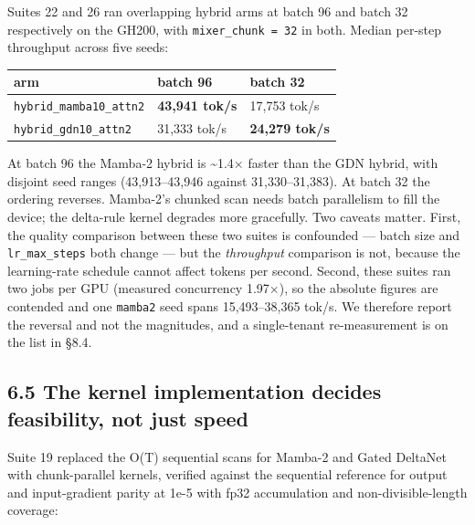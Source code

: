 Suites 22 and 26 ran overlapping hybrid arms at batch 96 and batch 32 respectively on the GH200,
with \texttt{mixer\_chunk\ =\ 32} in both. Median per-step throughput across five seeds:

{%
{\small\begin{longtable}[]{@{}lll@{}}
\toprule\noalign{}
arm & batch 96 & batch 32 \\
\midrule\noalign{}
\endhead
\bottomrule\noalign{}
\endlastfoot
\texttt{hybrid\_mamba10\_attn2} & \textbf{43,941 tok/s} & 17,753 tok/s \\
\texttt{hybrid\_gdn10\_attn2} & 31,333 tok/s & \textbf{24,279 tok/s} \\
\end{longtable}}
}

At batch 96 the Mamba-2 hybrid is \textasciitilde1.4$\times$ faster than the GDN hybrid, with disjoint seed ranges
(43,913--43,946 against 31,330--31,383). At batch 32 the ordering reverses. Mamba-2's chunked scan
needs batch parallelism to fill the device; the delta-rule kernel degrades more gracefully. Two
caveats matter. First, the quality comparison between these two suites is confounded --- batch size
and \texttt{lr\_max\_steps} both change --- but the \emph{throughput} comparison is not, because the learning-rate
schedule cannot affect tokens per second. Second, these suites ran two jobs per GPU (measured
concurrency 1.97$\times$), so the absolute figures are contended and one \texttt{mamba2} seed spans
15,493--38,365 tok/s. We therefore report the reversal and not the magnitudes, and a single-tenant
re-measurement is on the list in \S8.4.

\subsection{6.5 The kernel implementation decides feasibility, not just speed}\label{the-kernel-implementation-decides-feasibility-not-just-speed}

Suite 19 replaced the O(T) sequential scans for Mamba-2 and Gated DeltaNet with chunk-parallel
kernels, verified against the sequential reference for output and input-gradient parity at 1e-5
with fp32 accumulation and non-divisible-length coverage:

